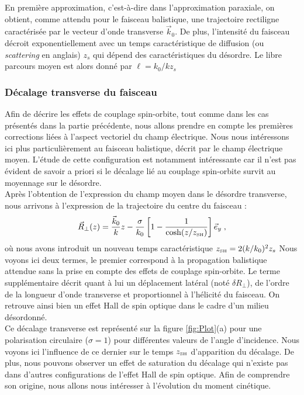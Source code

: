 \documentclass[a4paper,11pt]{article} %
\begin{document}
	En première approximation, c'est-à-dire dans l'approximation paraxiale, on obtient, comme attendu pour le faisceau balistique, une trajectoire rectiligne caractérisée par le vecteur d'onde transverse $ \vec{k}_0 $. De plus, l'intensité du faisceau décroit exponentiellement avec un temps caractéristique de diffusion (ou \textit{scattering} en anglais) $ z_s $ qui dépend des caractéristiques du désordre. Le libre parcours moyen est alors donné par $ \ell = k_0/k z_s $\\
	
	\subsubsection{Décalage transverse du faisceau}
	
	Afin de décrire les effets de couplage spin-orbite, tout comme dans les cas présentés dans la partie précédente, nous allons prendre en compte les premières corrections liées à l'aspect vectoriel du champ électrique. Nous nous intéressons ici plus particulièrement au faisceau balistique, décrit par le champ électrique moyen. L'étude de cette configuration est notamment intéressante car il n'est pas évident de savoir a priori si le décalage lié au couplage spin-orbite survit au moyennage sur le désordre.\\
	
	Après l'obtention de l'expression du champ moyen dans le désordre transverse, nous arrivons à l'expression de la trajectoire du centre du faisceau :
	\begin{equation*}
		\vec{R}_\perp (z) = \frac{\vec{k}_0}{k} z - \frac{\sigma}{k_0} \left[ 1 - \frac{1}{\cosh (z/z_\text{\tiny SH})} \right] \vec{e}_y \; ,
	\end{equation*}
	où nous avons introduit un nouveau temps caractéristique $ z_\text{{\tiny SH}} = 2 (k/k_0)^2 z_s  $ Nous voyons ici deux termes, le premier correspond à la propagation balistique attendue sans la prise en compte des effets de couplage spin-orbite. Le terme supplémentaire décrit quant à lui un déplacement latéral (noté $ \delta R_\perp $), de l'ordre de la longueur d'onde transverse et proportionnel à l'hélicité du faisceau. On retrouve ainsi bien un effet Hall de spin optique dans le cadre d'un milieu désordonné.\\
	
	
	Ce décalage transverse est représenté sur la figure \ref{fig:Plot}(a) pour une polarisation circulaire ($\sigma = 1$) pour différentes valeurs de l'angle d'incidence. Nous voyons ici l'influence de ce dernier sur le temps $ z_\text{{\tiny SH}} $ d'apparition du décalage. De plus, nous pouvons observer un effet de saturation du décalage qui n'existe pas dans d'autres configurations de l'effet Hall de spin optique. Afin de comprendre son origine, nous allons nous intéresser à l'évolution du moment cinétique.
	
\end{document}
